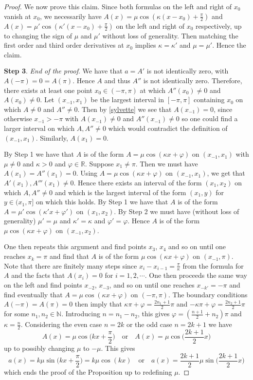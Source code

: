 \documentclass[12pt]{amsart}
\numberwithin{equation}{section}
\numberwithin{equation}{section}
\begin{document}
\begin{proof}
We now prove this claim. Since both formulas on the left and right of $x_0$ vanish at $x_0$, we necessarily have $A(x)=\mu \cos(\kappa (x-x_0)+\frac \pi 2)$ and $A(x)=\mu' \cos(\kappa' (x-x_0)+\frac \pi 2)$ on the left and right of $x_0$ respectively, up to changing the sign of $\mu$ and $\mu'$ without loss of generality. Then matching the first order and third order derivatives at $x_0$ implies $\kappa=\kappa'$ and $\mu=\mu'$. Hence the claim.

\medskip

\noindent \textbf{Step 3}. \emph{End of the proof}. We have that $a=A'$ is not identically zero, with $A(-\pi)=0=A(\pi)$. Hence $A$ and thus $A''$ is not identically zero. Therefore, there exists at least one point $x_0\in (-\pi,\pi)$ at which $A''(x_0)\neq 0$ and $A(x_0)\neq 0$. Let $(x_{-1},x_{1})$ be the largest interval in $[-\pi,\pi]$ containing $x_0$ on which $A\neq 0$ and $A''\neq 0$. Then by \eqref{sylvette} we see that $A(x_{-1})=0$, since otherwise $x_{-1}>-\pi$ with $A(x_{-1})\neq 0$ and $A''(x_{-1})\neq 0$ so one could find a larger interval on which $A,A''\neq 0$ which would contradict the definition of $(x_{-1},x_1)$. Similarly, $A(x_1)=0$.

By Step 1 we have that $A$ is of the form $A= \mu \cos(\kappa x+ \varphi)$ on $(x_{-1},x_1)$ with $\mu\neq 0$ and $\kappa>0$ and $\varphi\in \mathbb R$. Suppose $x_1\neq \pi$. Then we must have $A(x_1)=A''(x_1)=0$. Using $A= \mu \cos(\kappa x+ \varphi)$ on $(x_{-1},x_1)$, we get that $A'(x_1),A'''(x_1)\neq 0$. Hence there exists an interval of the form $(x_1,x_2)$ on which $A,A''\neq 0$ and which is the largest interval of the form $(x_1,y)$ for $y\in (x_1,\pi]$ on which this holds. By Step 1 we have that $A$ is of the form $A= \mu' \cos(\kappa' x+ \varphi')$ on $(x_{1},x_2)$. By Step 2 we must have (without loss of generality) $\mu'=\mu$ and $\kappa'=\kappa$ and $\varphi'=\varphi$. Hence $A$ is of the form $\mu \cos(\kappa x+ \varphi)$ on $(x_{-1},x_2)$.

One then repeats this argument and find points $x_3$, $x_4$ and so on until one reaches $x_k=\pi$ and find that $A$ is of the form $\mu \cos(\kappa x+ \varphi)$ on $(x_{-1},\pi)$. Note that there are finitely many steps since $x_{i}-x_{i-1}=\frac{\pi}{\kappa}$ from the formula for $A$ and the facts that $A(x_i)=0$ for $i=1, 2, \cdots$.  One then proceeds the same way on the left and find points $x_{-2}$, $x_{-3}$, and so on until one reaches $x_{-k'}=-\pi$ and find eventually that $A=\mu \cos(\kappa x+ \varphi)$ on $(-\pi,\pi)$. The boundary conditions $A(-\pi)=A(\pi)=0$ then imply that $\kappa \pi +\varphi =\frac{2n_1+1}{2}\pi$ and $-\kappa \pi +\varphi =\frac{2n_2+1}{2}\pi$ for some $n_1,n_2\in \mathbb N$. Introducing $n=n_1-n_2$, this gives $\varphi=(\frac{n+1}{2}+n_2)\pi$ and $\kappa=\frac{n}{2}$. Considering the even case $n=2k$ or the odd case $n=2k+1$ we have
$$
A(x)=\mu \cos \Big(k x+\frac \pi 2\Big) \quad \mbox{or} \quad A(x)=\mu \cos \Big(\frac{2k+1}{2} x\Big)
$$
up to possibly changing $\mu$ to $-\mu$. This gives
$$
a(x)=k\mu \sin \Big(kx+\frac \pi 2\Big)=k\mu \cos(kx) \quad \mbox{or} \quad a(x)=\frac{2k+1}{2}\mu \sin \Big(\frac{2k+1}{2} x\Big)
$$
which ends the proof of the Proposition up to redefining $\mu$.
\end{proof}
\end{document}

